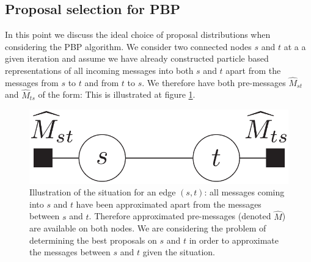 \subsection{Proposal selection for PBP}
In this point we discuss the ideal choice of proposal distributions when considering the PBP algorithm. We consider two connected nodes $s$ and $t$ at a a given iteration and assume we have already constructed particle based representations of all incoming messages into both $s$ and $t$ apart from the messages from $s$ to $t$ and from $t$ to $s$. 
We therefore have both pre-messages $\widehat M_{st}$ and $\widehat M_{ts}$ of the form:
%
%
This is illustrated at figure \ref{representation-edge-pbp}. 

\begin{figure}[!h]
\center
\includegraphics[width=.4\textwidth]{figures/general/belief-st}
\caption{\label{representation-edge-pbp}Illustration of the situation for an edge $(s,t)$: all messages coming into $s$ and $t$ have been approximated apart from the messages between $s$ and $t$. Therefore approximated pre-messages (denoted $\widehat M$) are available on both nodes. We are considering the problem of determining the best proposals on $s$ and $t$ in order to approximate the messages between $s$ and $t$ given the situation.}
\end{figure}

